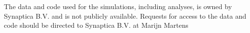 \noindent The data and code used for the simulations, including analyses, is owned by Synaptica B.V.
and is not publicly available. Requests for access to the data and code should be directed to Synaptica B.V. at Marijn Martens

